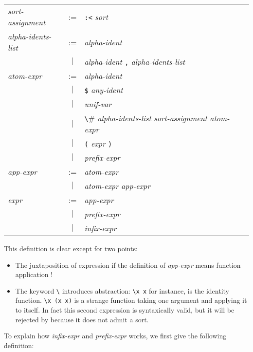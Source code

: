 \begin{center}
\begin{tabular}{lclr}
{\it sort-assignment} &:=& \verb#:<# {\it sort} \\
{\it alpha-idents-list} &:=& {\it alpha-ident} \\
  &$|$& {\it alpha-ident} \verb#,# {\it alpha-idents-list} \\
{\it atom-expr} &:=& {\it alpha-ident} \\
  &$|$& \verb#$# {\it any-ident}  \\
  &$|$& {\it unif-var} \\
  &$|$& \verb#\# {\it alpha-idents-list} {\it sort-assignment} {\it
atom-expr} \\
  &$|$& \verb#(# {\it expr} \verb#)# \\
  &$|$& {\it prefix-expr} \\
{\it app-expr} &:=& {\it atom-expr} \\
  &$|$& {\it atom-expr} {\it app-expr} \\
{\it expr} &:=&  {\it app-expr} \\
&$|$& {\it prefix-expr} \\
&$|$& {\it infix-expr} \\
\end{tabular}
\end{center}

This definition is clear except for two points:
\begin{itemize}
\item The juxtaposition of expression if the definition of {\it
app-expr} means function application !
\item The keyword \verb#\# introduces abstraction:
\verb#\x x# for instance, is the identity function.
\verb#\x (x x)# is a strange function taking one argument and applying
it to itself. In fact this second expression is syntaxically valid, but
it will be rejected by \AFD{}  because it does not admit a sort.
\end{itemize}

To explain how {\it infix-expr} and {\it prefix-expr} works, we first
give the following definition:

